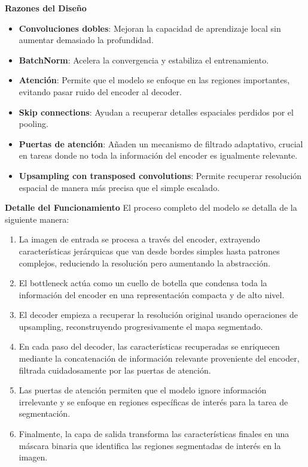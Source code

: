 \textbf{Razones del Diseño}
\begin{itemize}
    \item \textbf{Convoluciones dobles}: Mejoran la capacidad de aprendizaje local sin aumentar demasiado la profundidad.
    \item \textbf{BatchNorm}: Acelera la convergencia y estabiliza el entrenamiento.
    \item \textbf{Atención}: Permite que el modelo se enfoque en las regiones importantes, evitando pasar ruido del encoder al decoder.
    \item \textbf{Skip connections}: Ayudan a recuperar detalles espaciales perdidos por el pooling.
    \item \textbf{Puertas de atención}: Añaden un mecanismo de filtrado adaptativo, crucial en tareas donde no toda la información del encoder es igualmente relevante.
    \item \textbf{Upsampling con transposed convolutions}: Permite recuperar resolución espacial de manera más precisa que el simple escalado.
\end{itemize}

\textbf{Detalle del Funcionamiento}
El proceso completo del modelo se detalla de la siguiente manera:
\begin{enumerate}
\item La imagen de entrada se procesa a través del encoder, extrayendo características jerárquicas que van desde bordes simples hasta patrones complejos, reduciendo la resolución pero aumentando la abstracción.
\item El bottleneck actúa como un cuello de botella que condensa toda la información del encoder en una representación compacta y de alto nivel.
\item El decoder empieza a recuperar la resolución original usando operaciones de upsampling, reconstruyendo progresivamente el mapa segmentado.
\item En cada paso del decoder, las características recuperadas se enriquecen mediante la concatenación de información relevante proveniente del encoder, filtrada cuidadosamente por las puertas de atención.
\item Las puertas de atención permiten que el modelo ignore información irrelevante y se enfoque en regiones específicas de interés para la tarea de segmentación.
\item Finalmente, la capa de salida transforma las características finales en una máscara binaria que identifica las regiones segmentadas de interés en la imagen.
\end{enumerate}

